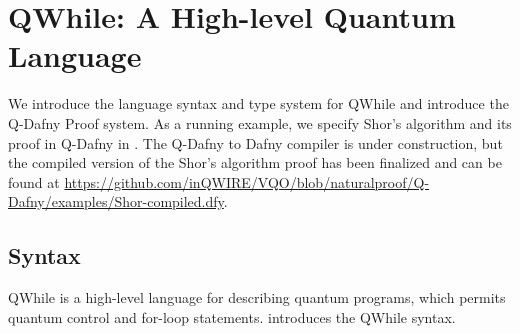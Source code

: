 \section{QWhile: A High-level Quantum Language}
\label{sec:vqir}

We introduce the language syntax and type system for QWhile and introduce the Q-Dafny Proof system.
As a running example, we specify Shor's algorithm and its proof in Q-Dafny in .
The Q-Dafny to Dafny compiler is under construction, but the compiled version of the Shor's algorithm proof has been finalized
and can be found at \url{https://github.com/inQWIRE/VQO/blob/naturalproof/Q-Dafny/examples/Shor-compiled.dfy}.


\subsection{Syntax}
\sloppy
QWhile is a high-level language for describing quantum programs,
which permits quantum control and for-loop statements.
 introduces the QWhile syntax. 

